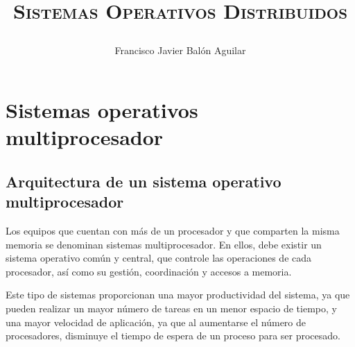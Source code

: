 \documentclass[a4paper, 11pt, titlepage]{article}
\title{{\scshape\Huge Sistemas Operativos Distribuidos \par}}
\author{Francisco Javier Balón Aguilar}
\begin{document}
\maketitle
\renewcommand{\contentsname}{Índice de contenidos} %
\tableofcontents %

\listoffigures

\listoftables
\newpage


\section{Sistemas operativos multiprocesador}

    \subsection{Arquitectura de un sistema operativo multiprocesador}

        Los equipos que cuentan con más de un procesador y que comparten la misma memoria
        se denominan sistemas multiprocesador. En ellos, debe existir un sistema operativo 
        común y central, que controle las operaciones de cada procesador, así como su 
        gestión, coordinación y accesos a memoria.

        Este tipo de sistemas proporcionan una mayor productividad del sistema, ya que 
        pueden realizar un mayor número de tareas en un menor espacio de tiempo, y una 
        mayor velocidad de aplicación, ya que al aumentarse el número de procesadores,
        disminuye el tiempo de espera de un proceso para ser procesado.
\end{document}
